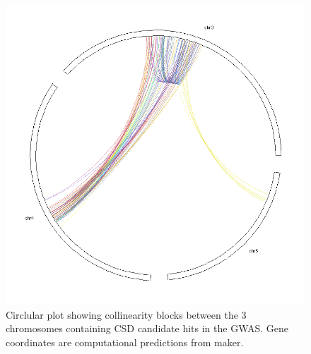 \documentclass[10pt,a4paper]{report}
\begin{document}
\begin{itemize}
\begin{figure}[h!]
\begin{center}
\includegraphics[width=\textwidth]{homology/LF_MCScanX_circle_3chr_makergenes.png}
\caption{Circlular plot showing collinearity blocks between the 3 chromosomes containing CSD candidate hits in the GWAS. Gene coordinates are computational predictions from maker.}
\label{collin_3chr_maker}
\end{center}
\end{figure}


\end{itemize}
\end{document}
